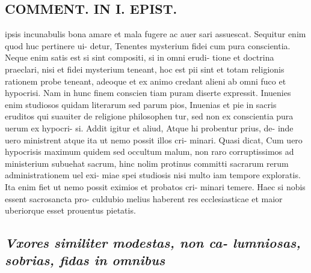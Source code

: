 \documentclass{article}
\begin{document}
\begin{pages}
\section*{COMMENT. IN I. EPIST. }\pstart ipsis incunabulis bona amare et mala fugere ac auer sari assuescat. Sequitur enim quod huc pertinere ui- detur, Tenentes mysterium fidei cum pura conscientia. Neque enim satis est si sint compositi, si in omni erudi- tione et doctrina praeclari, nisi et fidei mysterium teneant, hoc est pii sint et totam religionis rationem probe teneant, adeoque et ex animo credant alieni ab omni fuco et hypocrisi. Nam in hunc finem conscien tiam puram diserte expressit. Inuenies enim studiosos quidam literarum sed parum pios, Inuenias et pie in sacris eruditos qui suauiter de religione philosophen tur, sed non ex conscientia pura uerum ex hypocri- si. Addit igitur et aliud, Atque hi probentur prius, de- inde uero ministrent atque ita ut nemo possit illos cri- minari. Quasi dicat, Cum uero hypocrisis maximum quidem sed occultum malum, non raro corruptissimos ad ministerium subuehat sacrum, hinc nolim protinus committi sacrarum rerum administrationem uel exi- miae spei studiosis nisi multo iam tempore exploratis. Ita enim fiet ut nemo possit eximios et probatos cri- minari temere. Haec si nobis essent sacrosancta pro- culdubio melius haberent res ecclesiasticae et maior uberiorque esset prouentus pietatis.  \pend
{}
{}
\subsection*{\textit{Vxores similiter modestas, non ca- lumniosas, sobrias, fidas in omnibus  }}

\end{pages}
\end{document}
